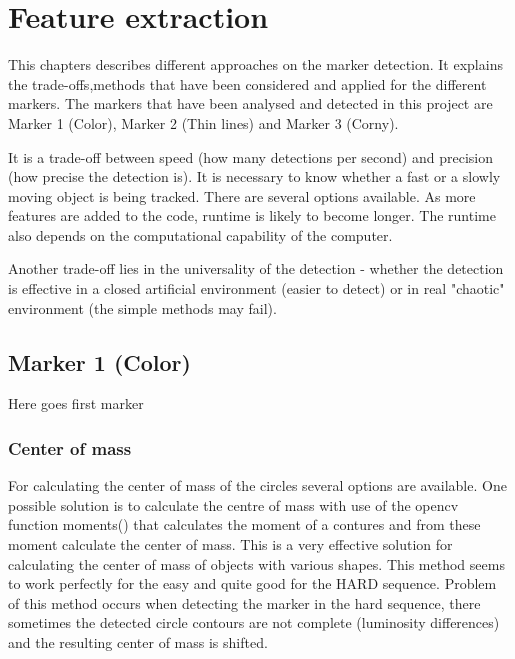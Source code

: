 \chapter{Feature extraction} %
\label{chap:feature_extraction}
This chapters describes different approaches on the marker detection. It explains the trade-offs,methods that have been considered and applied for the different markers. The markers that have been analysed and detected in this project are Marker 1 (Color), Marker 2 (Thin lines) and Marker 3 (Corny). 


It is a trade-off between speed (how many detections per second) and precision (how precise the detection is). It is necessary to know whether a fast or a slowly moving object is being tracked. There are several options available. As more features are added to the code, runtime is likely to become longer. The runtime also depends on the computational capability of the computer.

Another trade-off lies in the universality of the detection - whether the detection is effective in a closed artificial environment (easier to detect) or in real "chaotic" environment (the simple methods may fail).

\newpage


\section{Marker 1 (Color)} 
Here goes first marker


\subsection{Center of mass}
For calculating the center of mass of the circles several options are available.
One possible solution is to calculate the centre of mass with use of the opencv function
moments() that calculates the moment of a contures and from these moment calculate the
center of mass. This is a very effective solution for calculating the center of mass of
objects with various shapes. This method seems to work perfectly for the easy and quite good
for the HARD sequence. Problem of this method occurs when detecting the marker in the hard sequence,
there sometimes the detected circle contours are not complete (luminosity differences) and the resulting
center of mass is shifted. 

